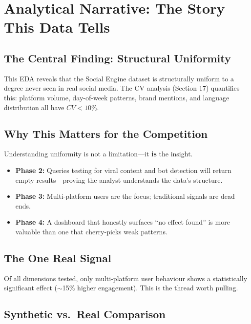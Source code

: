 \documentclass[11pt,a4paper]{article}
\begin{document}
\section{Analytical Narrative: The Story This Data Tells}

\subsection*{The Central Finding: Structural Uniformity}

This EDA reveals that the Social Engine dataset is structurally uniform to a degree never seen in real social media. The CV analysis (Section 17) quantifies this: platform volume, day-of-week patterns, brand mentions, and language distribution all have $CV < 10\%$.

\subsection*{Why This Matters for the Competition}

Understanding uniformity is not a limitation---it \textbf{is} the insight.

\begin{itemize}[leftmargin=*, itemsep=2pt]
    \item \textbf{Phase 2:} Queries testing for viral content and bot detection will return empty results---proving the analyst understands the data's structure.
    \item \textbf{Phase 3:} Multi-platform users are the focus; traditional signals are dead ends.
    \item \textbf{Phase 4:} A dashboard that honestly surfaces ``no effect found'' is more valuable than one that cherry-picks weak patterns.
\end{itemize}

\subsection*{The One Real Signal}

Of all dimensions tested, only multi-platform user behaviour shows a statistically significant effect ($\sim$15\% higher engagement). This is the thread worth pulling.

\subsection*{Synthetic vs.\ Real Comparison}
\end{document}
